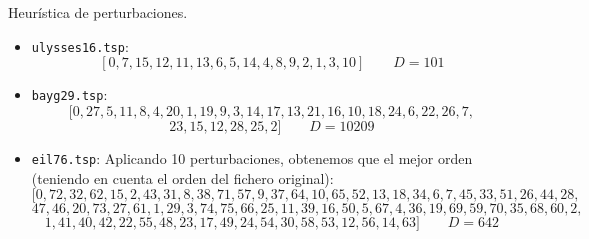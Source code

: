 \documentclass[10pt, xcolor=table]{beamer}
\begin{document}
\begin{frame}[fragile]{Heurística de perturbaciones. }
\begin{itemize}
	\item \texttt{ulysses16.tsp}:
	\[
		[0,7,15,12,11,13,6,5,14,4,8,9,2,1,3,10] \qquad D = 101
	\]
	\item \texttt{bayg29.tsp}:
	\[
		[0,27,5,11,8,4,20,1,19,9,3,14,17,13,21,16,10,18,24,6,22,26,7,
	\]
	\[
		23,15,12,28,25,2] \qquad D = 10209
	\]
	\item \texttt{eil76.tsp}: Aplicando 10 perturbaciones, obtenemos que el mejor orden (teniendo en cuenta el orden del fichero original):
	\footnotesize
	\[
		[0,72,32,62,15,2,43,31,8,38,71,57,9,37,64,10,65,52,13,18,34,6,7,45,33,51,26,44,28,
	\]
	\[
		47,46,20,73,27,61,1,29,3,74,75,66,25,11,39,16,50,5,67,4,36,19,69,59,70,35,68,60,2,
	\]
	\[
		1,41,40,42,22,55,48,23,17,49,24,54,30,58,53,12,56,14,63] \qquad D = 642
	\]
	\normalsize
\end{itemize}
\end{frame}
\end{document}
